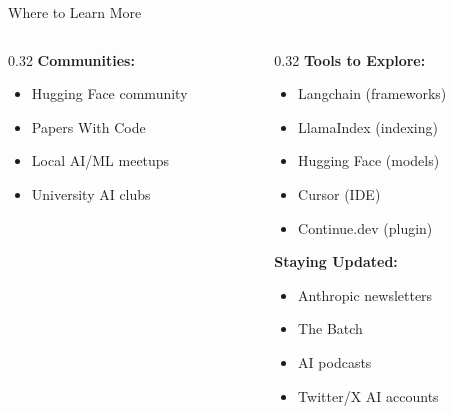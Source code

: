 \documentclass[aspectratio=169,11pt]{beamer}
\begin{document}
\begin{frame}{Where to Learn More}
\begin{columns}[T]
\begin{column}{0.32\textwidth}
            \vspace{0.3cm}
            \textbf{Communities:}
            \begin{itemize}
                \item Hugging Face community
                \item Papers With Code
                \item Local AI/ML meetups
                \item University AI clubs
            \end{itemize}
        \end{column}
        \begin{column}{0.32\textwidth}
            \textbf{Tools to Explore:}
            \begin{itemize}
                \item Langchain (frameworks)
                \item LlamaIndex (indexing)
                \item Hugging Face (models)
                \item Cursor (IDE)
                \item Continue.dev (plugin)
            \end{itemize}

            \vspace{0.3cm}
            \textbf{Staying Updated:}
            \begin{itemize}
                \item Anthropic newsletters
                \item The Batch
                \item AI podcasts
                \item Twitter/X AI accounts
            \end{itemize}
        \end{column}
    \end{columns}
\end{frame}
\end{document}
